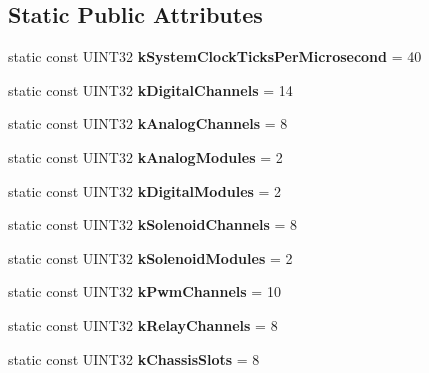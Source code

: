 \subsection*{\-Static \-Public \-Attributes}
\begin{DoxyCompactItemize}
\item 
\hypertarget{classSensorBase_a62b93c02393e42cb99cb02f2ea5c3210}{static const \-U\-I\-N\-T32 {\bfseries k\-System\-Clock\-Ticks\-Per\-Microsecond} = 40}\label{classSensorBase_a62b93c02393e42cb99cb02f2ea5c3210}

\item 
\hypertarget{classSensorBase_a7f940856e53b128fdf79e02a0847f698}{static const \-U\-I\-N\-T32 {\bfseries k\-Digital\-Channels} = 14}\label{classSensorBase_a7f940856e53b128fdf79e02a0847f698}

\item 
\hypertarget{classSensorBase_ab2640677a9876b6d9931a64e49fe1854}{static const \-U\-I\-N\-T32 {\bfseries k\-Analog\-Channels} = 8}\label{classSensorBase_ab2640677a9876b6d9931a64e49fe1854}

\item 
\hypertarget{classSensorBase_ae26b98f1438498ca476792ed36885717}{static const \-U\-I\-N\-T32 {\bfseries k\-Analog\-Modules} = 2}\label{classSensorBase_ae26b98f1438498ca476792ed36885717}

\item 
\hypertarget{classSensorBase_a61358418acb62c70a31e34c2066ae005}{static const \-U\-I\-N\-T32 {\bfseries k\-Digital\-Modules} = 2}\label{classSensorBase_a61358418acb62c70a31e34c2066ae005}

\item 
\hypertarget{classSensorBase_a94aa98723f06c8d3db4392a3570c37ee}{static const \-U\-I\-N\-T32 {\bfseries k\-Solenoid\-Channels} = 8}\label{classSensorBase_a94aa98723f06c8d3db4392a3570c37ee}

\item 
\hypertarget{classSensorBase_ac2bbf6ee96fced8af6e08459461c377a}{static const \-U\-I\-N\-T32 {\bfseries k\-Solenoid\-Modules} = 2}\label{classSensorBase_ac2bbf6ee96fced8af6e08459461c377a}

\item 
\hypertarget{classSensorBase_a245dda830a4dbc0de6e3482aa17c5681}{static const \-U\-I\-N\-T32 {\bfseries k\-Pwm\-Channels} = 10}\label{classSensorBase_a245dda830a4dbc0de6e3482aa17c5681}

\item 
\hypertarget{classSensorBase_aa9042b498388c6ab62378a8672d81ddf}{static const \-U\-I\-N\-T32 {\bfseries k\-Relay\-Channels} = 8}\label{classSensorBase_aa9042b498388c6ab62378a8672d81ddf}

\item 
\hypertarget{classSensorBase_a6a758308e49ed0f04b34d3f39c7db91a}{static const \-U\-I\-N\-T32 {\bfseries k\-Chassis\-Slots} = 8}\label{classSensorBase_a6a758308e49ed0f04b34d3f39c7db91a}

\end{DoxyCompactItemize}
